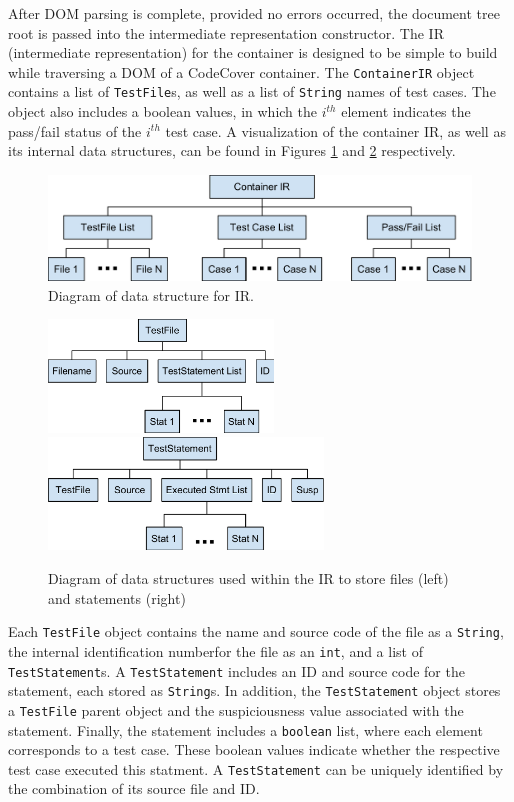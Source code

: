 After DOM parsing is complete, provided no errors occurred, the document tree root is
passed into the intermediate representation constructor.  The IR (intermediate representation)
for the container is designed to be simple to build while traversing a DOM of a CodeCover
container.  The \texttt{ContainerIR} object contains a list of \texttt{TestFile}s, as well
as a list of \texttt{String} names of test cases.  The object also includes a boolean values,
in which the $i^{th}$ element indicates the pass/fail status of the $i^{th}$ test case.  A 
visualization of the container IR, as well as its internal data structures, can be found in 
Figures \ref{fig:ir} and \ref{fig:ir2} respectively.  

\begin{figure}[tb]
\centering
\includegraphics[width=0.8\linewidth]{img/ContainerIR.pdf}
\caption{Diagram of data structure for IR.}
\label{fig:ir}
\end{figure}

\begin{figure}[tb]
\centering
\includegraphics[height=30mm]{img/TestFile.pdf}
\hspace{0.1\linewidth}
\includegraphics[height=30mm]{img/TestStatement.pdf}
\caption{Diagram of data structures used within the IR to store files (left) and 
statements (right)}
\label{fig:ir2}
\end{figure}

Each \texttt{TestFile} object contains the name and source code of the file as a \texttt{String}, the internal identification numberfor the file as an \texttt{int}, and a list of \texttt{TestStatement}s.  
A \texttt{TestStatement} includes an ID and source code for the statement, each stored as \texttt{String}s.  In addition, the \texttt{TestStatement} object stores a \texttt{TestFile} 
parent object and the suspiciousness value associated with the statement.  Finally, the statement 
includes a \texttt{boolean} list, where each element corresponds to a test case.  These boolean 
values indicate whether the respective test case executed this statment.  A \texttt{TestStatement} 
can be uniquely identified by the combination of its source file and ID.

